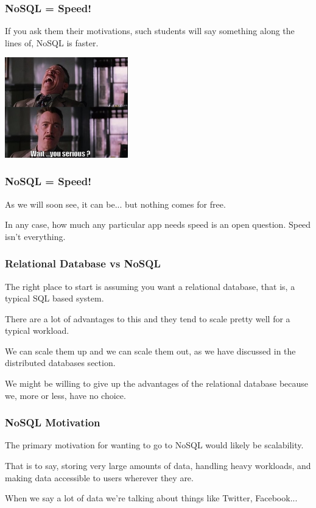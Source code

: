 \begin{frame}
\frametitle{NoSQL = Speed!}

If you ask them their motivations, such students will say something along the lines of, NoSQL is faster. 


\begin{center}
	\includegraphics[width=0.4\textwidth]{images/serious.png}
\end{center}

\end{frame}



\begin{frame}
\frametitle{NoSQL = Speed!}

As we will soon see, it can be... but nothing comes for free. 

In any case, how much any particular app needs speed is an open question. Speed isn't everything. 


\end{frame}


\begin{frame}
\frametitle{Relational Database vs NoSQL}

The right place to start is assuming you want a relational database, that is, a typical SQL based system. 

There are a lot of advantages to this and they tend to scale pretty well for a typical workload. 

We can scale them up and we can scale them out, as we have discussed in the distributed databases section. 

We might be willing to give up the advantages of the relational database because we, more or less, have no choice.


\end{frame}



\begin{frame}
\frametitle{NoSQL Motivation}

The primary motivation for wanting to go to NoSQL would likely be scalability. 

That is to say, storing very large amounts of data, handling heavy workloads, and making data accessible to users wherever they are. 

When we say a lot of data we're talking about things like Twitter, Facebook...

\end{frame}



